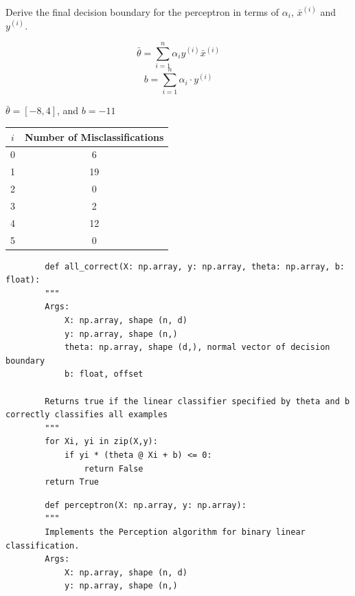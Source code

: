 \documentclass[12pt, letterpaper]{article}
\begin{document}
\begin{subproblem}{}
    Derive the final decision boundary for the perceptron in terms of $\alpha_i$, $\bar{x}^{(i)}$ and $y^{(i)}$.
\end{subproblem}
\begin{solution}
    \[\bar{\theta}= \sum_{i=1}^{n} \alpha_iy^{(i)}\bar{x}^{(i)}\]
    \[b = \sum_{i=1}^{n} \alpha_i \cdot y^{(i)}\]
\end{solution}

\begin{subproblem}{}
    
\end{subproblem}
\begin{solution}
    $\bar{\theta} = \left[ -8, 4 \right]$, and $b= -11$
    \begin{center}
        \begin{tabular}{|c|c|}
            \hline
            \(i\) & Number of Misclassifications \\
            \hline
            0 & 6 \\
            \hline
            1 & 19\\
            \hline
            2 & 0\\
            \hline
            3 & 2\\
            \hline
            4 & 12\\
            \hline
            5 & 0\\
            \hline
        \end{tabular}
    \end{center}

    \begin{verbatim}
        def all_correct(X: np.array, y: np.array, theta: np.array, b: float):
        """
        Args:
            X: np.array, shape (n, d) 
            y: np.array, shape (n,)
            theta: np.array, shape (d,), normal vector of decision boundary
            b: float, offset

        Returns true if the linear classifier specified by theta and b correctly classifies all examples
        """
        for Xi, yi in zip(X,y):
            if yi * (theta @ Xi + b) <= 0:
                return False
        return True
    \end{verbatim}
    \begin{verbatim}
        def perceptron(X: np.array, y: np.array):
        """
        Implements the Perception algorithm for binary linear classification.
        Args:
            X: np.array, shape (n, d) 
            y: np.array, shape (n,)


\end{verbatim}
\end{solution}
\end{document}
